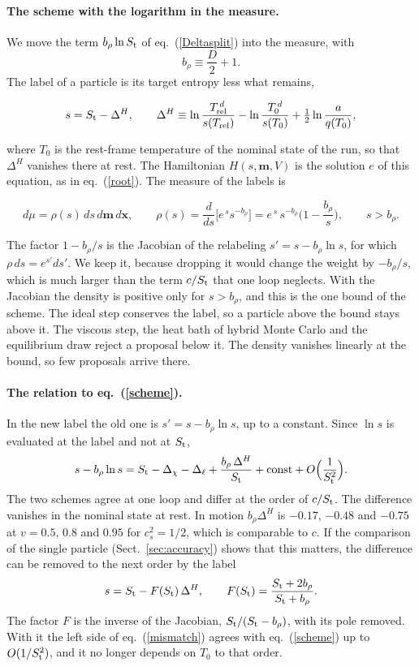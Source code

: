 \documentclass[11pt,aps,preprint,nofootinbib,superscriptaddress,tightenlines]{revtex4-2}
\def\st{\begin{equation}}
\def\stp{\end{equation}}
\def\Eq#1{eq.~(\ref{#1})}
\def\Sect#1{Sect.~\ref{#1}}
\let\oldparagraph\paragraph
\renewcommand{\paragraph}{\par\bigskip\oldparagraph}
\begin{document}
\paragraph{The scheme with the logarithm in the measure.}  We move the term $b_\rho\ln S_{\rm t}$ of \Eq{Deltasplit} into the measure, with
\st
b_\rho\equiv\frac D2+1 .
\stp
The label of a particle is its target entropy less what remains,
\begin{keyeq}
\st
s=S_{\rm t}-\Delta^{H},\qquad
\Delta^{H}\equiv\ln\frac{T_{\rm rel}^{\,d}}{s(T_{\rm rel})}-\ln\frac{T_0^{\,d}}{s(T_0)}+\tfrac12\ln\frac{a}{q(T_0)} ,
\label{schemeH}
\stp
\end{keyeq}
where $T_0$ is the rest-frame temperature of the nominal state of the run, so that $\Delta^H$ vanishes there at rest.  The Hamiltonian
$H(s,\bm m,V)$ is the solution $e$ of this equation, as in \Eq{root}.  The measure of the labels is
\begin{keyeq}
\st
d\mu=\rho(s)\,ds\,d\bm m\,d\bm x,\qquad \rho(s)=\frac{d}{ds}\Big[e^{\,s}s^{-b_\rho}\Big]=e^{\,s}\,s^{-b_\rho}\Big(1-\frac{b_\rho} s\Big),\qquad s>b_\rho .
\label{rho}
\stp
\end{keyeq}
The factor $1-b_\rho/s$ is the Jacobian of the relabeling $s'=s-b_\rho\ln s$, for which $\rho\,ds=e^{s'}ds'$.  We keep it, because dropping it would
change the weight by $-b_\rho/s$, which is much larger than the term $c/S_{\rm t}$ that one loop neglects.  With the Jacobian the density is positive
only for $s>b_\rho$, and this is the one bound of the scheme.  The ideal step conserves the label, so a particle above the bound stays above it.  The
viscous step, the heat bath of hybrid Monte Carlo and the equilibrium draw reject a proposal below it.  The density vanishes linearly at the bound,
so few proposals arrive there.

\paragraph{The relation to \Eq{scheme}.}  In the new label the old one is $s'=s-b_\rho\ln s$, up to a constant.  Since $\ln s$ is evaluated at the
label and not at $S_{\rm t}$,
\st
s-b_\rho\ln s=S_{\rm t}-\Delta_\chi-\Delta_\ell+\frac{b_\rho\,\Delta^H}{S_{\rm t}}+\text{const}+O\Big(\frac1{S_{\rm t}^2}\Big) .
\label{mismatch}
\stp
The two schemes agree at one loop and differ at the order of $c/S_{\rm t}$.  The difference vanishes in the nominal state at rest.  In motion
$b_\rho\Delta^H$ is $-0.17$, $-0.48$ and $-0.75$ at $v=0.5$, $0.8$ and $0.95$ for $c_s^2=1/2$, which is comparable to $c$.  If the comparison of the
single particle (\Sect{sec:accuracy}) shows that this matters, the difference can be removed to the next order by the label
\st
s=S_{\rm t}-F(S_{\rm t})\,\Delta^{H},\qquad F(S_{\rm t})=\frac{S_{\rm t}+2b_\rho}{S_{\rm t}+b_\rho} .
\label{schemeF}
\stp
The factor $F$ is the inverse of the Jacobian, $S_{\rm t}/(S_{\rm t}-b_\rho)$, with its pole removed.  With it the left side of \Eq{mismatch} agrees with
\Eq{scheme} up to $O(1/S_{\rm t}^2)$, and it no longer depends on $T_0$ to that order.
\end{document}

